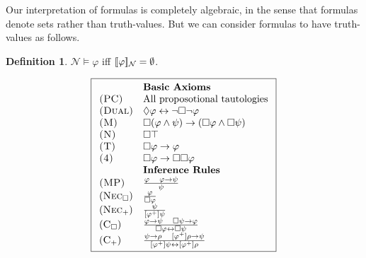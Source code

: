 \documentclass[12pt]{article}
\theoremstyle{definition}
\newtheorem{definition}{Definition}
\newcommand{\semantics}[1]{[\![\mbox{\em $ #1 $\/}]\!]}
\newcommand{\orr}{\vee}
\newcommand{\Net}{\mathcal{N}}
\newcommand{\axiom}{\textsc}
\begin{document}
Our interpretation of formulas is completely algebraic, in the sense that formulas denote sets rather than truth-values.  But we can consider formulas to have truth-values as follows.

\begin{definition}
$\Net \models \varphi$ iff $\semantics{\varphi}_\Net = \emptyset$.
\end{definition}
\begin{figure}[ht!]
\begin{equation*}
\boxed{
\begin{array}{ll}
    & \textbf{Basic Axioms}\\
    
    \axiom{(PC)} & \mbox{All proposotional tautologies}\\

    \axiom{(Dual)} & \Diamond \varphi \leftrightarrow \neg \Box \neg \varphi\\
    
    \axiom{(M)} & \Box(\varphi \land \psi) \to (\Box \varphi \land \Box \psi)\\
    
    
    \axiom{(N)} & \Box \top\\
    
    \axiom{(T)} & \Box \varphi \to \varphi\\
    
    \axiom{(4)} & \Box \varphi \to \Box \Box \varphi\\
    
    & \textbf{Inference Rules}\\

    \axiom{(MP)} & \frac{\varphi \quad \varphi \to \psi}{\psi} \\

    (\axiom{Nec}_\Box) & \frac{\varphi}{\Box \varphi} \\
    (
    \axiom{Nec}_+) & \frac{\psi}{[\varphi^+] \psi} \\
    
    (\axiom{C}_\Box) & \frac{\varphi \to \psi \quad \Box \psi \to \varphi}{\Box \varphi \leftrightarrow \Box \psi} \\
    
    (\axiom{C}_+) & \frac{\psi \to \rho \quad [\varphi^+] \rho \to \psi}{[\varphi^+] \psi \leftrightarrow [\varphi^+] \rho} \\
    

\end{array}}
\end{equation*}
\end{figure}
\end{document}

